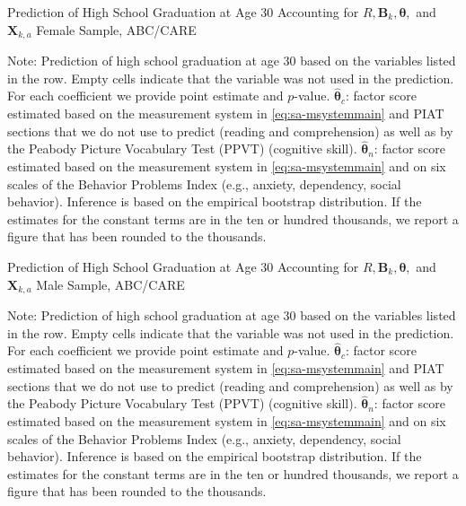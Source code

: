 \begin{table}
\begin{threeparttable}
\caption{Prediction of High School Graduation at Age 30 Accounting for $R, \bm{B}_k, \bm{\theta},$ and $\bm{X}_{k,a}$ Female Sample, ABC/CARE}
\label{table:end2}
\centering
\scriptsize

\begin{tablenotes}
\footnotesize
\item Note: Prediction of high school graduation at age 30 based on the variables listed in the row. Empty cells indicate that the variable was not used in the prediction. For each coefficient we provide point estimate and $p$-value. $\hat{\bm{\theta}}_{c}$: factor score estimated based on the measurement system in \eqref{eq:sa-msystemmain} and PIAT sections that we do not use to predict (reading and comprehension) as well as by the Peabody Picture Vocabulary Test (PPVT) (cognitive skill). $\hat{\bm{\theta}}_{n}$: factor score estimated based on the measurement system in \eqref{eq:sa-msystemmain} and on six scales of the Behavior Problems Index (e.g., anxiety, dependency, social behavior). Inference is based on the empirical bootstrap distribution. If the estimates for the constant terms are in the ten or hundred thousands, we report a figure that has been rounded to the thousands.
\end{tablenotes}
\end{threeparttable}
\end{table}

\begin{table}
\begin{threeparttable}
\caption{Prediction of High School Graduation at Age 30 Accounting for $R, \bm{B}_k, \bm{\theta},$ and $\bm{X}_{k,a}$ Male Sample, ABC/CARE}
\label{table:end2}
\centering
\scriptsize

\begin{tablenotes}
\footnotesize
\item Note: Prediction of high school graduation at age 30 based on the variables listed in the row. Empty cells indicate that the variable was not used in the prediction. For each coefficient we provide point estimate and $p$-value. $\hat{\bm{\theta}}_{c}$: factor score estimated based on the measurement system in \eqref{eq:sa-msystemmain} and PIAT sections that we do not use to predict (reading and comprehension) as well as by the Peabody Picture Vocabulary Test (PPVT) (cognitive skill). $\hat{\bm{\theta}}_{n}$: factor score estimated based on the measurement system in \eqref{eq:sa-msystemmain} and on six scales of the Behavior Problems Index (e.g., anxiety, dependency, social behavior). Inference is based on the empirical bootstrap distribution. If the estimates for the constant terms are in the ten or hundred thousands, we report a figure that has been rounded to the thousands.
\end{tablenotes}
\end{threeparttable}
\end{table}


